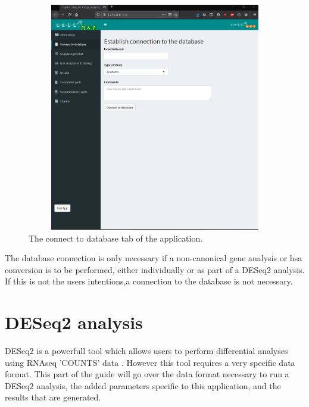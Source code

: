 \documentclass[11pt]{article}
\begin{document}
\begin{figure}[h!]
\centering
\includegraphics[width=15cm,height=10cm,keepaspectratio]{connect_DB.png}
\caption{The connect to database tab of the application.}
\label{fig:connect_DB}
\end{figure}

The database connection is only necessary if a non-canonical gene analysis or \acrshort{hsa} conversion is to be performed, either individually or as part of a \acrshort{DESeq2} analysis. If this is not the users intentions,a connection to the database is not necessary.

\section{DESeq2 analysis}
\acrshort{DESeq2} is a powerfull tool which allows users to perform differential analyses using RNAseq 'COUNTS' data \cite{love2014moderated}. However this tool requires a very specific data format. This part of the guide will go over the data format necessary to run a \acrshort{DESeq2} analysis, the added parameters specific to this application, and the results that are generated.
\end{document}
